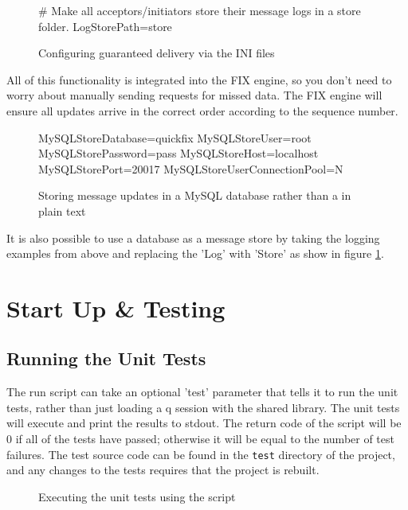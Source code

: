 \begin{figure}[H]
\begin{inicode}
[DEFAULT]
# Make all acceptors/initiators store their message logs in a store folder.
LogStorePath=store
\end{inicode}
\caption{Configuring guaranteed delivery via the INI files}
\end{figure}

All of this functionality is integrated into the FIX engine, so you don't need to worry about manually sending requests for missed data. The FIX engine will ensure all updates arrive in the correct order according to the sequence number.

\begin{figure}[H]
\begin{inicode}
MySQLStoreDatabase=quickfix
MySQLStoreUser=root
MySQLStorePassword=pass
MySQLStoreHost=localhost
MySQLStorePort=20017
MySQLStoreUserConnectionPool=N
\end{inicode}
\caption{Storing message updates in a MySQL database rather than a in plain text}
\label{fig:sql-store}
\end{figure}

It is also possible to use a database as a message store by taking the logging examples from above
and replacing the 'Log' with 'Store' as show in figure \ref{fig:sql-store}.

\section{Start Up \& Testing}

\subsection{Running the Unit Tests}

The run script can take an optional 'test' parameter that tells it to run the unit tests, rather
than just loading a q session with the shared library. The unit tests will execute and print the
results to stdout. The return code of the script will be 0 if all of the tests have passed; otherwise
it will be equal to the number of test failures. The test source code can be found in the \verb|test| directory of the project, and any changes to the tests requires that the project is rebuilt.

\begin{figure}[H]
\caption{Executing the unit tests using the script}
\end{figure}

